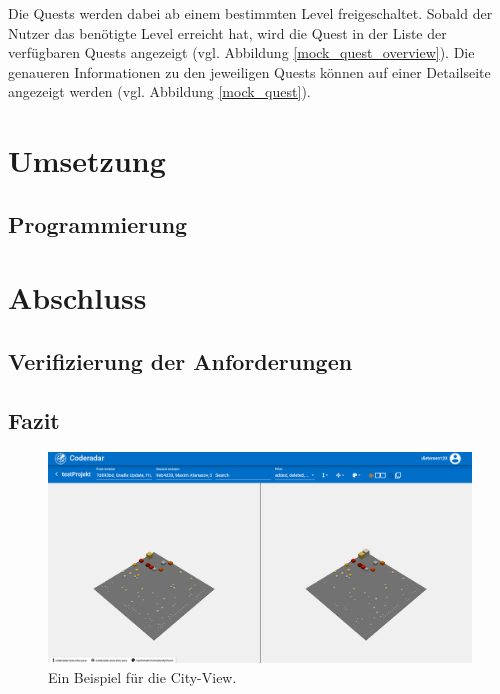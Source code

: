 \documentclass[
	oneside,  %
	ngerman, 
	final, 
	11pt, 
	a4paper, 
	1.1headlines, 
	headinclude=false, 
	footinclude=false, 
	mpinclude=false, 
	pagesize, 
	onecolumn, 
	titlepage, 
	parskip=half, 
	headsepline, 
	chapterprefix=false, 
	version=first, 
	listof=totoc, 
	bibliography=totoc, 
	toc=graduated, 
	fleqn
]{scrbook}
\begin{document}
Die Quests werden dabei ab einem bestimmten Level freigeschaltet. 
Sobald der Nutzer das benötigte Level erreicht hat, wird die Quest in der Liste der verfügbaren Quests angezeigt (vgl. Abbildung \ref{mock_quest_overview}).
Die genaueren Informationen zu den jeweiligen Quests können auf einer Detailseite angezeigt werden (vgl. Abbildung \ref{mock_quest}).

\chapter{Umsetzung}
\label{Umsetzung}


\section{Programmierung}
\label{Programmierung}


\chapter{Abschluss}
\label{Abschluss}


\section{Verifizierung der Anforderungen}
\label{Verifizierung_Anforderungen}


\section{Fazit}
\label{Fazit}


\begin{figure}[htb]
	\begin{center}
		\includegraphics[width=\linewidth]{images/city_view}
		\caption{Ein Beispiel für die City-View.}
		\label{city_view}
	\end{center}
\end{figure}
\end{document}
